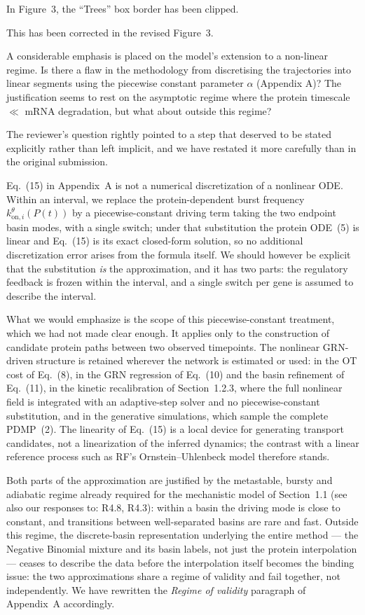 \documentclass[11pt,a4paper]{article}
\newcounter{revtotal}   %
\newcounter{revlocal}   %
\newcommand{\currentreviewer}{}  %
\newcommand{\revcomment}[2]{%
  \stepcounter{revtotal}%
  \stepcounter{revlocal}%
  \edef\commentlabel{\currentreviewer.\arabic{revlocal}}%
  \begin{tcolorbox}[revstyle,
      title={\commentlabel\ $|$\ #1}]
    #2
  \end{tcolorbox}%
  \edef\lastcommentlabel{\commentlabel}%
}
\newcommand{\response}[1]{%
  \begin{tcolorbox}[respstyle,
      title={Response to \lastcommentlabel}]
    #1
  \end{tcolorbox}%
}
\begin{document}
\revcomment{Figure~3: ``Trees'' box border clipped}{%
In Figure~3, the ``Trees'' box border has been clipped.}
\response{%
This has been corrected in the revised Figure~3.}

\revcomment{Validity of piecewise-linear interpolation outside the adiabatic regime}{%
A considerable emphasis is placed on the model's extension to a non-linear regime. Is
there a flaw in the methodology from discretising the trajectories into linear segments using
the piecewise constant parameter $\alpha$ (Appendix A)? The justification seems to rest on the
asymptotic regime where the protein timescale $\ll$ mRNA degradation, but what about
outside this regime?}
\response{%
The reviewer's question rightly pointed to a step that deserved to be stated explicitly rather
than left implicit, and we have restated it more carefully than in the original submission.

Eq.~(15) in Appendix~A is not a numerical discretization of a nonlinear ODE. Within an interval,
we replace the protein-dependent burst frequency $k^{\theta}_{\mathrm{on},i}(P(t))$ by a
piecewise-constant driving term taking the two endpoint basin modes, with a single switch;
under that substitution the protein ODE~(5) is linear and Eq.~(15) is its exact closed-form
solution, so no additional discretization error arises from the formula itself. We should
however be explicit that the substitution \emph{is} the approximation, and it has two parts: the
regulatory feedback is frozen within the interval, and a single switch per gene is assumed to
describe the interval.

What we would emphasize is the scope of this piecewise-constant treatment, which we had not made
clear enough. It applies only to the construction of candidate protein paths between two
observed timepoints. The nonlinear GRN-driven structure is retained wherever the network is
estimated or used: in the OT cost of Eq.~(8), in the GRN regression of Eq.~(10) and the basin
refinement of Eq.~(11), in the kinetic recalibration of Section~1.2.3, where the full nonlinear
field is integrated with an adaptive-step solver and no piecewise-constant substitution, and in
the generative simulations, which sample the complete PDMP~(2). The linearity of Eq.~(15) is a
local device for generating transport candidates, not a linearization of the inferred dynamics;
the contrast with a linear reference process such as RF's Ornstein--Uhlenbeck model therefore
stands.

Both parts of the approximation are justified by the metastable, bursty and adiabatic regime
already required for the mechanistic model of Section~1.1 (see also our responses to: R4.8,
R4.3): within a basin the driving mode is close to constant, and transitions between
well-separated basins are rare and fast. Outside this regime, the discrete-basin representation
underlying the entire method --- the Negative Binomial mixture and its basin labels, not just
the protein interpolation --- ceases to describe the data before the interpolation itself becomes
the binding issue: the two approximations share a regime of validity and fail together, not
independently. We have rewritten the \emph{Regime of validity} paragraph of Appendix~A
accordingly.}
\end{document}
